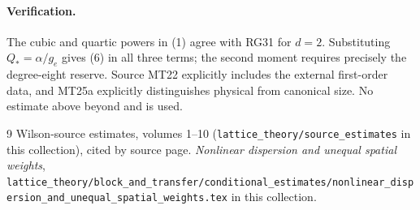 \documentclass[11pt]{article}
\begin{document}
\paragraph{Verification.}
The cubic and quartic powers in (1) agree with RG31 for $d=2$.
Substituting $Q_*=\alpha/g_e$ gives (6) in all three terms; the second moment
requires precisely the degree-eight reserve. Source MT22 explicitly includes the
external first-order data, and MT25a explicitly distinguishes physical from
canonical size. No estimate above
beyond \cite{W} and \cite{ND} is used.
\begin{thebibliography}{9}
 Wilson-source estimates, volumes 1--10 (\texttt{lattice\_theory/source\_estimates} in this collection), cited by source page.
 \emph{Nonlinear dispersion and unequal spatial weights}, \texttt{lattice\_theory/block\_and\_transfer/conditional\_estimates/nonlinear\_dispersion\_and\_unequal\_spatial\_weights.tex} in this collection.
\end{thebibliography}
\end{document}
